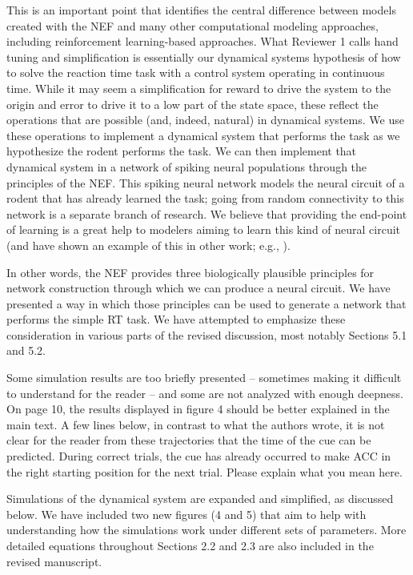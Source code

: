 \documentclass[11pt,paper=letter]{scrartcl}
\begin{document}
This is an important point that identifies
the central difference between
models created with the NEF
and many other computational modeling approaches,
including reinforcement learning-based approaches.
What Reviewer 1 calls hand tuning and simplification
is essentially our dynamical systems hypothesis
of how to solve the reaction time task
with a control system operating in continuous time.
While it may seem a simplification
for reward to drive the system to the origin
and error to drive it to a low part of the state space,
these reflect the operations
that are possible (and, indeed, natural) in dynamical systems.
We use these operations to implement a dynamical system
that performs the task
as we hypothesize the rodent performs the task.
We can then implement that dynamical system
in a network of spiking neural populations
through the principles of the NEF.
This spiking neural network models
the neural circuit of a rodent
that has already learned the task;
going from random connectivity to this network
is a separate branch of research.
We believe that providing the end-point of learning
is a great help to modelers
aiming to learn this kind of neural circuit
(and have shown an example of this
in other work; e.g., ).

In other words, the NEF provides three biologically plausible
principles for network construction
through which we can produce a neural circuit.
We have presented a way in which those principles
can be used to generate a network
that performs the simple RT task.
We have attempted to
emphasize these consideration
in various parts of the revised discussion,
most notably Sections 5.1 and 5.2.

\begin{quoting}
  Some simulation results are too briefly presented -- sometimes
  making it difficult to understand for the reader -- and some are not
  analyzed with enough deepness. On page 10, the results displayed in
  figure 4 should be better explained in the main text. A few lines
  below, in contrast to what the authors wrote, it is not clear for
  the reader from these trajectories that the time of the cue can be
  predicted. During correct trials, the cue has already occurred to
  make ACC in the right starting position for the next trial. Please
  explain what you mean here.
\end{quoting}

Simulations of the dynamical system are expanded
and simplified, as discussed below.
We have included two new figures (4 and 5)
that aim to help with understanding
how the simulations work under different sets of parameters.
More detailed equations throughout Sections 2.2 and 2.3
are also included in the revised manuscript.
\end{document}
